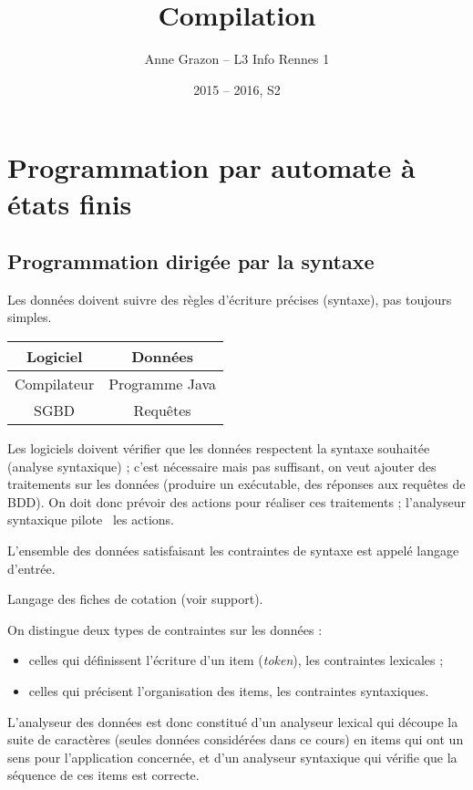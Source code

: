 \documentclass[a4paper]{article}
\title{Compilation}
\author{Anne Grazon -- L3 Info Rennes 1}
\date{2015 -- 2016, S2}
\begin{document}
\maketitle

\section{Programmation par automate à états finis}

\subsection{Programmation dirigée par la syntaxe}
Les données doivent suivre des règles d'écriture précises (syntaxe), pas toujours simples.
\begin{ex}\begin{tabular}{c|c}
	Logiciel & Données \\ \hline
	Compilateur & Programme Java \\
	SGBD & Requêtes \\
\end{tabular}\end{ex}

Les logiciels doivent vérifier que les données respectent la syntaxe souhaitée (analyse syntaxique) ; c'est nécessaire mais pas suffisant, on veut ajouter des traitements sur les données (produire un exécutable, des réponses aux requêtes de BDD). On doit donc prévoir des actions pour réaliser ces traitements ; l'analyseur syntaxique \og pilote \fg\ les actions.

L'ensemble des données satisfaisant les contraintes de syntaxe est appelé langage d'entrée.

\begin{ex}Langage des fiches de cotation (voir support).\end{ex}

On distingue deux types de contraintes sur les données :\begin{itemize}
	\item celles qui définissent l'écriture d'un item (\textit{token}), les contraintes lexicales ;
	\item celles qui précisent l'organisation des items, les contraintes syntaxiques.
\end{itemize}
L'analyseur des données est donc constitué d'un analyseur lexical qui découpe la suite de caractères (seules données considérées dans ce cours) en items qui ont un sens pour l'application concernée, et d'un analyseur syntaxique qui vérifie que la séquence de ces items est correcte.
\end{document}
